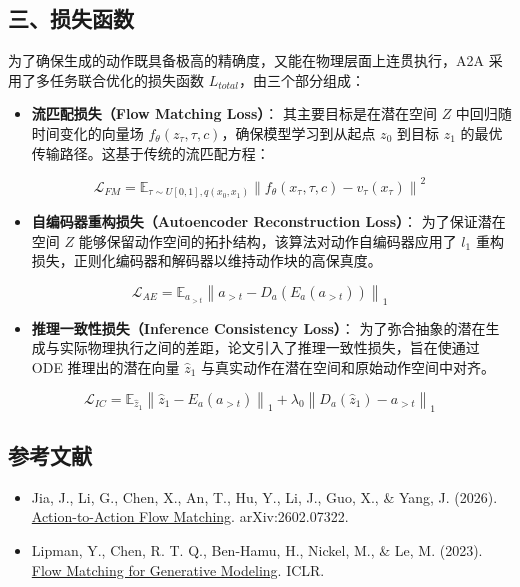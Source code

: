 \hypertarget{ux4e09ux635fux5931ux51fdux6570-1}{%
\subsection{三、损失函数}\label{ux4e09ux635fux5931ux51fdux6570-1}}

为了确保生成的动作既具备极高的精确度，又能在物理层面上连贯执行，A2A 采用了多任务联合优化的损失函数 \(L_{total}\)，由三个部分组成：

\begin{itemize}
\tightlist
\item
  \textbf{流匹配损失（Flow Matching Loss）}：
  其主要目标是在潜在空间 \(Z\) 中回归随时间变化的向量场 \(f_{\theta}(z_{\tau},\tau,c)\)，确保模型学习到从起点 \(z_0\) 到目标 \(z_1\) 的最优传输路径。这基于传统的流匹配方程：
\end{itemize}

\[
\mathcal{L}_{FM}=\mathbb{E}_{\tau\sim U[0,1],q(x_0,x_1)}\left\|f_{\theta}(x_{\tau},\tau,c)-v_{\tau}(x_{\tau})\right\|^2
\]

\begin{itemize}
\tightlist
\item
  \textbf{自编码器重构损失（Autoencoder Reconstruction Loss）}：
  为了保证潜在空间 \(Z\) 能够保留动作空间的拓扑结构，该算法对动作自编码器应用了 \(l_1\) 重构损失，正则化编码器和解码器以维持动作块的高保真度。
\end{itemize}

\[
\mathcal{L}_{AE}=\mathbb{E}_{a_{>t}}\left\|a_{>t}-D_a(E_a(a_{>t}))\right\|_1
\]

\begin{itemize}
\tightlist
\item
  \textbf{推理一致性损失（Inference Consistency Loss）}：
  为了弥合抽象的潜在生成与实际物理执行之间的差距，论文引入了推理一致性损失，旨在使通过 ODE 推理出的潜在向量 \(\hat{z}_1\) 与真实动作在潜在空间和原始动作空间中对齐。
\end{itemize}

\[
\mathcal{L}_{IC}=\mathbb{E}_{\hat{z}_1}\left\|\hat{z}_1-E_a(a_{>t})\right\|_1+\lambda_0\left\|D_a(\hat{z}_1)-a_{>t}\right\|_1
\]

\hypertarget{ux53c2ux8003ux6587ux732e-162}{%
\subsection{参考文献}\label{ux53c2ux8003ux6587ux732e-162}}

\begin{itemize}
\tightlist
\item
  Jia, J., Li, G., Chen, X., An, T., Hu, Y., Li, J., Guo, X., \& Yang, J. (2026). \href{https://arxiv.org/abs/2602.07322}{Action-to-Action Flow Matching}. arXiv:2602.07322.
\item
  Lipman, Y., Chen, R. T. Q., Ben-Hamu, H., Nickel, M., \& Le, M. (2023). \href{https://arxiv.org/abs/2210.02747}{Flow Matching for Generative Modeling}. ICLR.
\end{itemize}

